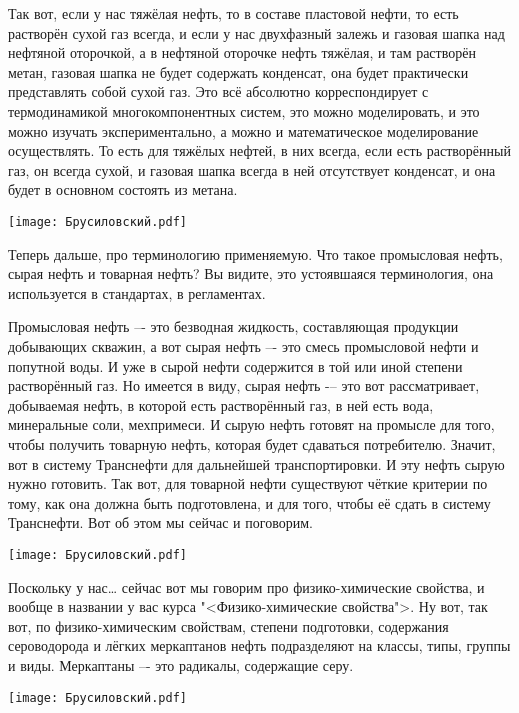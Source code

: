 \documentclass[main.tex]{subfiles}
\begin{document}
Так вот, если у нас тяжёлая нефть, то в составе пластовой нефти, то есть растворён сухой газ всегда, и если у нас двухфазный залежь и газовая шапка над нефтяной оторочкой, а в нефтяной оторочке нефть тяжёлая, и там растворён метан, газовая шапка не будет содержать конденсат, она будет практически представлять собой сухой газ.
Это всё абсолютно корреспондирует с термодинамикой многокомпонентных систем, это можно моделировать, и это можно изучать экспериментально, а можно и математическое моделирование осуществлять.
То есть для тяжёлых нефтей, в них всегда, если есть растворённый газ, он всегда сухой, и газовая шапка всегда в ней отсутствует конденсат, и она будет в основном состоять из метана.

\begin{center}
\texttt{[image: Брусиловский.pdf]}
\end{center}

Теперь дальше, про терминологию применяемую.
Что такое промысловая нефть, сырая нефть и товарная нефть?
Вы видите, это устоявшаяся терминология, она используется в стандартах, в регламентах.

Промысловая нефть –- это безводная жидкость, составляющая продукции добывающих скважин, а вот сырая нефть –- это смесь промысловой нефти и попутной воды.
И уже в сырой нефти содержится в той или иной степени растворённый газ.
Но имеется в виду, сырая нефть -– это вот рассматривает, добываемая нефть, в которой есть растворённый газ, в ней есть вода, минеральные соли, мехпримеси.
И сырую нефть готовят на промысле для того, чтобы получить товарную нефть, которая будет сдаваться потребителю.
Значит, вот в систему Транснефти для дальнейшей транспортировки.
И эту нефть сырую нужно готовить.
Так вот, для товарной нефти существуют чёткие критерии по тому, как она должна быть подготовлена, и для того, чтобы её сдать в систему Транснефти.
Вот об этом мы сейчас и поговорим.

\begin{center}
\texttt{[image: Брусиловский.pdf]}
\end{center}

Поскольку у нас… сейчас вот мы говорим про физико-химические свойства,
и вообще в названии у вас курса "<Физико-химические свойства">.
Ну вот, так вот, по физико-химическим свойствам, степени подготовки, содержания сероводорода и лёгких меркаптанов нефть подразделяют на классы, типы, группы и виды.
Меркаптаны –- это радикалы, содержащие серу.

\begin{center}
\texttt{[image: Брусиловский.pdf]}
\end{center}
\end{document}
